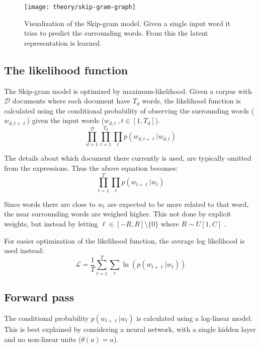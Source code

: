 \begin{figure}[h]
	\centering
	\texttt{[image: theory/skip-gram-graph]}
	\caption{Visualization of the Skip-gram model. Given a single input word it tries to predict the surrounding words. From this the latent representation is learned.}
	\label{fig:theory:skip-gram:graph}
\end{figure}

\subsection{The likelihood function}
The Skip-gram model is optimized by maximum-likelihood. Given a corpus with $\mathcal{D}$ documents where each document have $T_d$ words, the likelihood function is calculated using the conditional probability of observing the surrounding words ($w_{d, t + \ell}$) given the input words ($w_{d, t}\ , t \in [1, T_d]$).
\begin{equation}
\prod_{d = 1}^{\mathcal{D}} \prod_{t = 1}^{T_d} \prod_{\ell} p(w_{d, t + \ell} | w_{d, t})
\end{equation}

The details about which document there currently is used, are typically omitted from the expressions. Thus the above equation becomes:
\begin{equation}
\prod_{t = 1}^{T} \prod_{\ell} p(w_{t + \ell} | w_{t})
\end{equation}

Since words there are close to $w_t$ are expected to be  more related to that word, the near surrounding words are weighed higher. This not done by explicit weights, but instead by letting $\ell \in [-R, R] \setminus \{ 0 \}$ where $R \sim U[1, C]$ \cite{word2vec-comparing}.

For easier optimization of the likelihood function, the average log likelihood is used instead:
\begin{equation}
\mathcal{L} = \frac{1}{T} \sum_{t = 1}^T \sum_{\ell} \ln( p(w_{t + \ell} | w_t) )
\end{equation}

\subsection{Forward pass}
The conditional probability $p(w_{t + \ell} | w_t)$ is calculated using a log-linear model. This is best explained by considering a neural network, with a single hidden layer and no non-linear units ($\theta(a) = a$).

